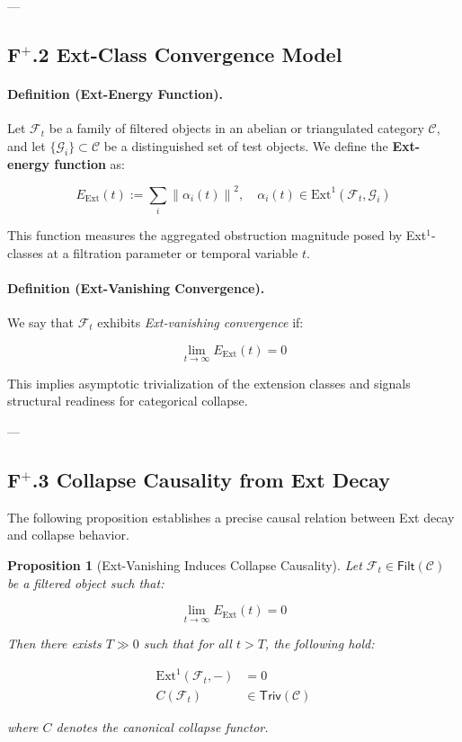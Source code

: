 \documentclass[11pt]{article}
\newtheorem{proposition}[theorem]{Proposition}
\begin{document}
---

\subsection*{F$^{+}$.2 Ext-Class Convergence Model}

\paragraph{Definition (Ext-Energy Function).}
Let \( \mathcal{F}_t \) be a family of filtered objects in an abelian or triangulated category \( \mathcal{C} \), and let \( \{ \mathcal{G}_i \} \subset \mathcal{C} \) be a distinguished set of test objects. We define the \textbf{Ext-energy function} as:

\[
E_{\mathrm{Ext}}(t) := \sum_{i} \left\| \alpha_i(t) \right\|^2, \quad \alpha_i(t) \in \mathrm{Ext}^1(\mathcal{F}_t, \mathcal{G}_i)
\]

This function measures the aggregated obstruction magnitude posed by Ext$^1$-classes at a filtration parameter or temporal variable \( t \).

\paragraph{Definition (Ext-Vanishing Convergence).}
We say that \( \mathcal{F}_t \) exhibits \emph{Ext-vanishing convergence} if:

\[
\lim_{t \to \infty} E_{\mathrm{Ext}}(t) = 0
\]

This implies asymptotic trivialization of the extension classes and signals structural readiness for categorical collapse.

---

\subsection*{F$^{+}$.3 Collapse Causality from Ext Decay}

The following proposition establishes a precise causal relation between Ext decay and collapse behavior.

\begin{proposition}[Ext-Vanishing Induces Collapse Causality]
Let \( \mathcal{F}_t \in \mathsf{Filt}(\mathcal{C}) \) be a filtered object such that:

\[
\lim_{t \to \infty} E_{\mathrm{Ext}}(t) = 0
\]

Then there exists \( T \gg 0 \) such that for all \( t > T \), the following hold:

\begin{align*}
\mathrm{Ext}^1(\mathcal{F}_t, -) &= 0 \\
C(\mathcal{F}_t) &\in \mathsf{Triv}(\mathcal{C})
\end{align*}

where \( C \) denotes the canonical collapse functor.
\end{proposition}
\end{document}
